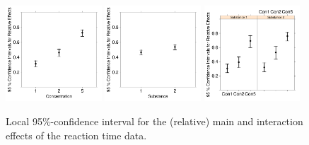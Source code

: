 \begin{figure}[t!]
\centering
\includegraphics[width=0.32\textwidth]{CI_nms_conc}
\includegraphics[width=0.32\textwidth]{CI_nms_subst}
\includegraphics[width=0.32\textwidth]{CI_nms_substconc}
\caption{\label{fig:nmsCI} Local 95\%-confidence interval for the (relative) main and interaction effects of the reaction time data.}
\end{figure}


